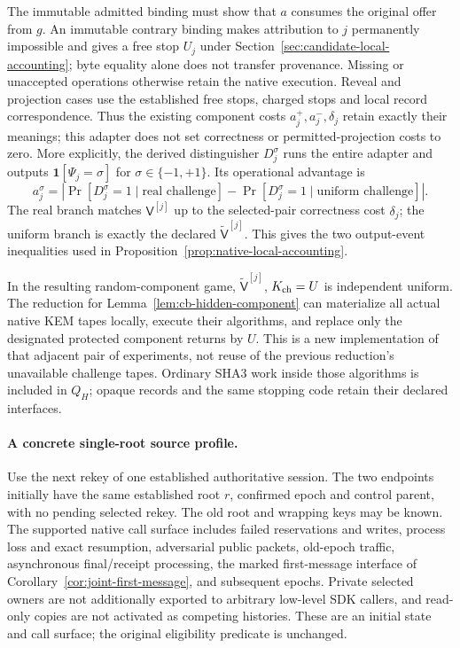 The immutable admitted binding must show that $a$ consumes the original
offer from $g$. An immutable contrary binding makes attribution to $j$
permanently impossible and gives a free stop $U_j$ under
Section~\ref{sec:candidate-local-accounting}; byte equality alone does not
transfer provenance. Missing or unaccepted operations otherwise retain the
native execution. Reveal and projection cases use the established free
stops, charged stops and local record correspondence. Thus the existing
component costs $a_j^+,a_j^-,\delta_j$ retain exactly their meanings;
this adapter does not set correctness or permitted-projection costs to zero.
More explicitly, the derived distinguisher $D_j^\sigma$ runs the entire
adapter and outputs $\mathbf1[\Psi_j=\sigma]$ for
$\sigma\in\{-1,+1\}$. Its operational advantage is
\[
 a_j^\sigma=\left|\Pr[D_j^\sigma=1\mid\text{real challenge}]
                    -\Pr[D_j^\sigma=1\mid\text{uniform challenge}]\right|.
\]
The real branch matches $\mathsf V^{[j]}$ up to the selected-pair
correctness cost $\delta_j$; the uniform branch is exactly the declared
$\widetilde{\mathsf V}^{[j]}$. This gives the two output-event
inequalities used in Proposition~\ref{prop:native-local-accounting}.

In the resulting random-component game,
$\widetilde{\mathsf V}^{[j]}$, $K_{\rm ch}=U$ is independent uniform.
The reduction for Lemma~\ref{lem:cb-hidden-component} can materialize all
actual native KEM tapes locally, execute their algorithms, and replace
only the designated protected component returns by $U$. This is a new
implementation of that adjacent pair of experiments, not reuse of the
previous reduction's unavailable challenge tapes. Ordinary SHA3 work
inside those algorithms is included in $Q_H$; opaque records and the same
stopping code retain their declared interfaces.

\paragraph{A concrete single-root source profile.}
Use the next rekey of one established authoritative session. The two
endpoints initially have the same established root $r$, confirmed epoch
and control parent, with no pending selected rekey. The old root and
wrapping keys may be known. The supported native call surface includes
failed reservations and writes, process loss and exact resumption,
adversarial public packets, old-epoch traffic, asynchronous final/receipt
processing, the marked first-message interface of
Corollary~\ref{cor:joint-first-message}, and subsequent epochs. Private
selected owners are not additionally exported to arbitrary low-level SDK
callers, and read-only copies are not activated as competing histories.
These are an initial state and call surface; the original eligibility
predicate is unchanged.

